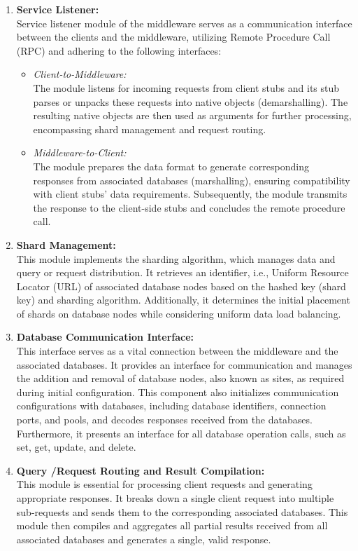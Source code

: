 \begin{enumerate}

\item \textbf{Service Listener:} \\
Service listener module of the middleware serves as a communication interface between the clients and the middleware, utilizing Remote Procedure Call (RPC) \cite{van1987connecting} and adhering to the following interfaces:

\begin{itemize}
\item[-] \emph{Client-to-Middleware:}  \\
The module listens for incoming requests from client stubs and its stub parses or unpacks these requests into native objects (demarshalling). The resulting native objects are then used as arguments for further processing, encompassing shard management and request routing.

\item[-] \emph{Middleware-to-Client:} \\
The module prepares the data format to generate corresponding responses from associated databases (marshalling), ensuring compatibility with client stubs' data requirements. Subsequently, the module transmits the response to the client-side stubs and concludes the remote procedure call.
\end{itemize}


\item \textbf{Shard Management:} \\
This module implements the sharding algorithm, which manages data and query or request distribution. It retrieves an identifier, i.e., Uniform Resource Locator (URL) of associated database nodes based on the hashed key (shard key) and sharding algorithm. Additionally, it determines the initial placement of shards on database nodes while considering uniform data load balancing.

\item \textbf{Database Communication Interface:} \\
This interface serves as a vital connection between the middleware and the associated databases. It provides an interface for communication and manages the addition and removal of database nodes, also known as sites, as required during initial configuration. This component also initializes communication configurations with databases, including database identifiers, connection ports, and pools, and decodes responses received from the databases. Furthermore, it presents an interface for all database operation calls, such as set, get, update, and delete.

\item \textbf{Query /Request Routing and Result Compilation:} \\
This module is essential for processing client requests and generating appropriate responses. It breaks down a single client request into multiple sub-requests and sends them to the corresponding associated databases. This module then compiles and aggregates all partial results received from all associated databases and generates a single, valid response.
\end{enumerate}

